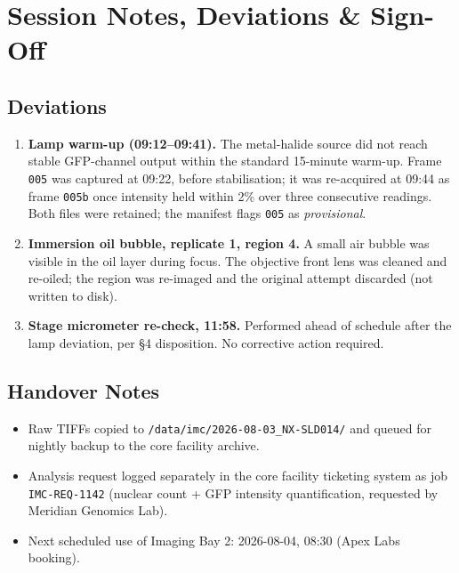 \section{Session Notes, Deviations \& Sign-Off}
\label{sec:notes}

\subsection{Deviations}

\begin{enumerate}
\item \textbf{Lamp warm-up (09:12--09:41).} The metal-halide source did not
      reach stable GFP-channel output within the standard 15-minute warm-up.
      Frame \texttt{005} was captured at 09:22, before stabilisation; it was
      re-acquired at 09:44 as frame \texttt{005b} once intensity held within
      2\% over three consecutive readings. Both files were retained; the
      manifest flags \texttt{005} as \textit{provisional}.
\item \textbf{Immersion oil bubble, replicate 1, region 4.} A small air
      bubble was visible in the oil layer during focus. The objective front
      lens was cleaned and re-oiled; the region was re-imaged and the
      original attempt discarded (not written to disk).
\item \textbf{Stage micrometer re-check, 11:58.} Performed ahead of schedule
      after the lamp deviation, per \S4 disposition. No corrective action
      required.
\end{enumerate}

\subsection{Handover Notes}

\begin{itemize}
\item Raw TIFFs copied to \texttt{/data/imc/2026-08-03\_NX-SLD014/} and queued
      for nightly backup to the core facility archive.
\item Analysis request logged separately in the core facility ticketing
      system as job \texttt{IMC-REQ-1142} (nuclear count + GFP intensity
      quantification, requested by Meridian Genomics Lab).
\item Next scheduled use of Imaging Bay 2: 2026-08-04, 08:30 (Apex Labs booking).
\end{itemize}

\vspace{0.6em}

